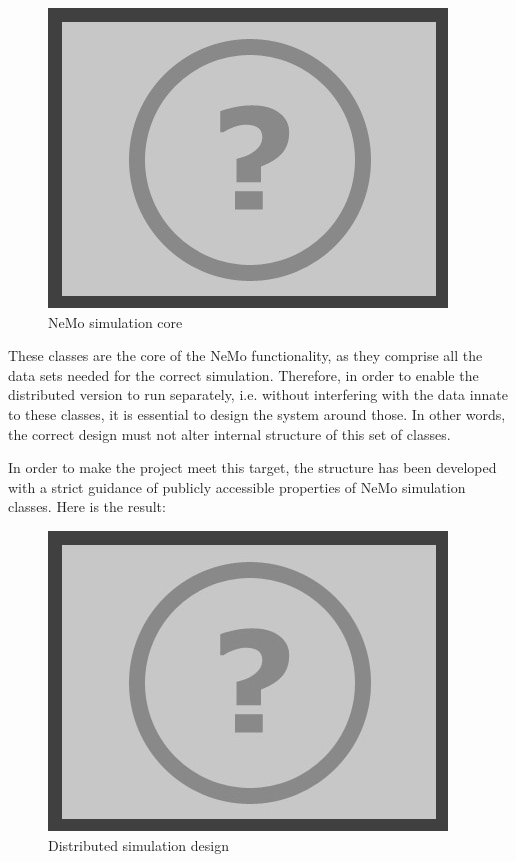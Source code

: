 \begin{figure}[h]
\begin{center}
\includegraphics[scale = 0.5]{images/placeholder.png}
\end{center}
\caption{NeMo simulation core}
\end{figure}

These classes are the core of the NeMo functionality, as they comprise all the data sets needed for the correct simulation. Therefore, in order to enable the distributed version to run separately, i.e. without interfering with the data innate to these classes, it is essential to design the system around those. In other words, the correct design must not alter internal structure of this set of classes.

In order to make the project meet this target, the structure has been developed with a strict guidance of publicly accessible properties of NeMo simulation classes. Here is the result:

\begin{figure}[h]
\begin{center}
\includegraphics[scale = 0.5]{images/placeholder.png}
\end{center}
\caption{Distributed simulation design}
\end{figure}

